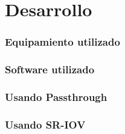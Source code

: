 \chapter{Desarrollo\label{sec:desarrollo}}


\subsection{Equipamiento utilizado\label{sec:equipamiento}}

\subsection{Software utilizado\label{sec:sw}}



\subsection{Usando Passthrough\label{sec:pt}}

\subsection{Usando SR-IOV\label{sec:sriov}}